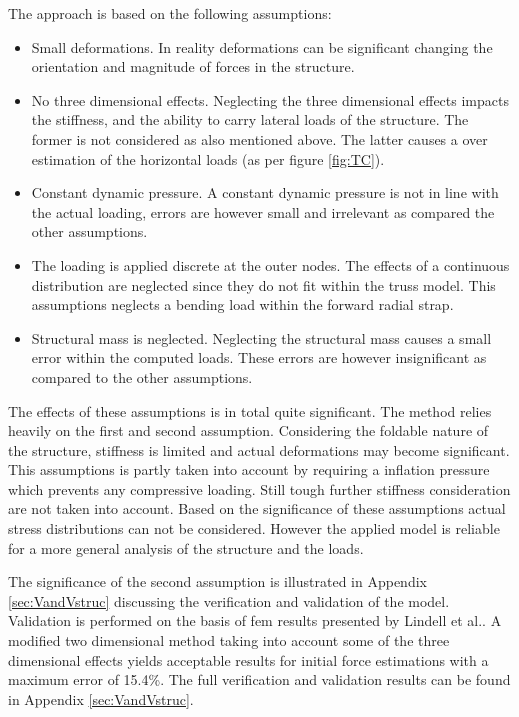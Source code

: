 The approach is based on the following assumptions:


\begin{itemize}
\item Small deformations. In reality deformations can be significant changing the orientation and magnitude of forces in the structure.
\item No three dimensional effects. Neglecting the three dimensional effects impacts the stiffness, and the ability to carry lateral loads of the structure. The former is not considered as also mentioned above. The latter causes a over estimation of the horizontal loads (as per figure \ref{fig:TC}).  
\item Constant dynamic pressure. A constant dynamic pressure is not in line with the actual loading, errors are however small and irrelevant as compared the other assumptions.
\item The loading is applied discrete at the outer nodes. The effects of a continuous distribution are neglected since they do not fit within the truss model. This assumptions neglects a bending load within the forward radial strap.
\item Structural mass is neglected. Neglecting the structural mass causes a small error within the computed loads. These errors are however insignificant as compared to the other assumptions.
\end{itemize} 

The effects of these assumptions is in total quite significant. The method relies heavily on the first and second assumption. Considering the foldable nature of the structure, stiffness is limited and actual deformations may become significant. This assumptions is partly taken into account by requiring a inflation pressure which prevents any compressive loading. Still tough further stiffness consideration are not taken into account. Based on the significance of these assumptions actual stress distributions can not be considered. However the applied model is reliable for a more general analysis of the structure and the loads.

The significance of the second assumption is illustrated in Appendix \ref{sec:VandVstruc} discussing the verification and validation of the model. Validation is performed on the basis of \gls{fem} results presented by Lindell et al.. A modified two dimensional method taking into account some of the three dimensional effects yields acceptable results for initial force estimations with a maximum error of 15.4\%. The full verification and validation results can be found in Appendix \ref{sec:VandVstruc}.


